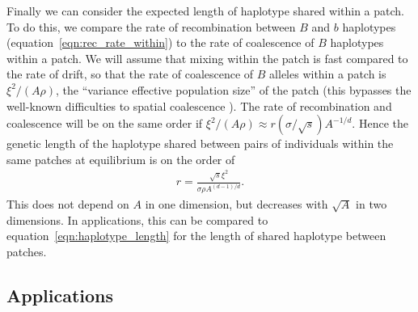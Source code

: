 \documentclass{article}
\newcommand{\citep}[1]{\cite{#1}}
\begin{document}
 
Finally we can consider the expected length of haplotype shared within a patch. 
To do this, we compare the rate of recombination between $B$ and $b$ haplotypes (equation~\ref{eqn:rec_rate_within})
to the rate of coalescence of $B$ haplotypes within a patch. 
We will assume that mixing within the patch is fast compared to the rate of drift, 
so that the rate of coalescence of $B$ alleles within a patch is 
$\xi^2/(A\rho)$,
the ``variance effective population size'' of the patch
(this bypasses the well-known difficulties to spatial coalescence \citep{felsenstein1975pain,barton2002neutral}).
The rate of recombination and coalescence will be on the same order if
$\xi^2 /(A\rho) \approx r (\sigma/\sqrt{s}) A^{-1/d}$.
Hence the genetic length of the haplotype shared between pairs of
individuals within the same patches at equilibrium is on the order of
\begin{align} \label{eqn:within_haplotype_length} 
  r = \frac{\sqrt{s} \xi^2}{\sigma \rho A^{(d-1)/d}}  .
\end{align}
This does not depend on $A$ in one dimension,
but decreases with $\sqrt{A}$ in two dimensions.
In applications, this can be compared to equation~\eqref{eqn:haplotype_length}
for the length of shared haplotype between patches.

\subsection{Applications} 
\label{ss:applications}
\end{document}
